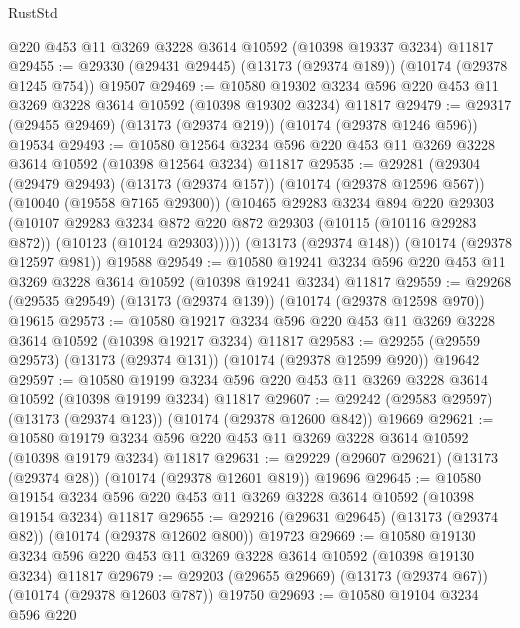 \begin{lexlean}{RustStd}
\begin{coremodule}
    @220
    @453
    @11
    @3269
    @3228
    @3614
    @10592
    (@10398 @19337 @3234)
    @11817
@29455 := @29330 (@29431 @29445) (@13173 (@29374 @189)) (@10174 (@29378 @1245 @754)) @19507
@29469 := @10580
    @19302
    @3234
    @596
    @220
    @453
    @11
    @3269
    @3228
    @3614
    @10592
    (@10398 @19302 @3234)
    @11817
@29479 := @29317 (@29455 @29469) (@13173 (@29374 @219)) (@10174 (@29378 @1246 @596)) @19534
@29493 := @10580
    @12564
    @3234
    @596
    @220
    @453
    @11
    @3269
    @3228
    @3614
    @10592
    (@10398 @12564 @3234)
    @11817
@29535 := @29281
    (@29304
      (@29479 @29493)
      (@13173 (@29374 @157))
      (@10174 (@29378 @12596 @567))
      (@10040 (@19558 @7165 @29300))
      (@10465
        @29283
        @3234
        @894
        @220
        @29303
        (@10107
          @29283
          @3234
          @872
          @220
          @872
          @29303
          (@10115 (@10116 @29283 @872))
          (@10123 (@10124 @29303)))))
    (@13173 (@29374 @148))
    (@10174 (@29378 @12597 @981))
    @19588
@29549 := @10580
    @19241
    @3234
    @596
    @220
    @453
    @11
    @3269
    @3228
    @3614
    @10592
    (@10398 @19241 @3234)
    @11817
@29559 := @29268 (@29535 @29549) (@13173 (@29374 @139)) (@10174 (@29378 @12598 @970)) @19615
@29573 := @10580
    @19217
    @3234
    @596
    @220
    @453
    @11
    @3269
    @3228
    @3614
    @10592
    (@10398 @19217 @3234)
    @11817
@29583 := @29255 (@29559 @29573) (@13173 (@29374 @131)) (@10174 (@29378 @12599 @920)) @19642
@29597 := @10580
    @19199
    @3234
    @596
    @220
    @453
    @11
    @3269
    @3228
    @3614
    @10592
    (@10398 @19199 @3234)
    @11817
@29607 := @29242 (@29583 @29597) (@13173 (@29374 @123)) (@10174 (@29378 @12600 @842)) @19669
@29621 := @10580
    @19179
    @3234
    @596
    @220
    @453
    @11
    @3269
    @3228
    @3614
    @10592
    (@10398 @19179 @3234)
    @11817
@29631 := @29229 (@29607 @29621) (@13173 (@29374 @28)) (@10174 (@29378 @12601 @819)) @19696
@29645 := @10580
    @19154
    @3234
    @596
    @220
    @453
    @11
    @3269
    @3228
    @3614
    @10592
    (@10398 @19154 @3234)
    @11817
@29655 := @29216 (@29631 @29645) (@13173 (@29374 @82)) (@10174 (@29378 @12602 @800)) @19723
@29669 := @10580
    @19130
    @3234
    @596
    @220
    @453
    @11
    @3269
    @3228
    @3614
    @10592
    (@10398 @19130 @3234)
    @11817
@29679 := @29203 (@29655 @29669) (@13173 (@29374 @67)) (@10174 (@29378 @12603 @787)) @19750
@29693 := @10580
    @19104
    @3234
    @596
    @220

\end{coremodule}
\end{lexlean}
